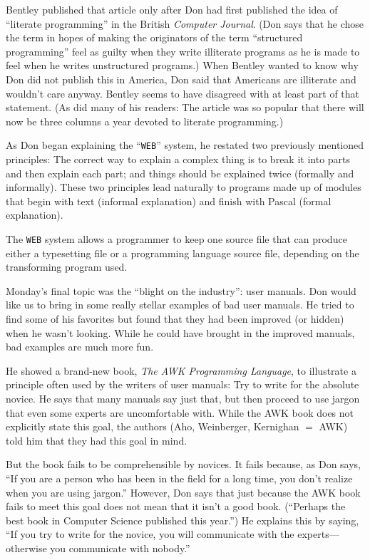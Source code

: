 Bentley published that article only after Don had first published the idea
of ``literate programming'' in the British {\sl Computer Journal}. (Don says that
he chose the term in hopes of making the originators of the term
``structured programming'' feel as guilty when they write illiterate
programs as he is made to feel when he writes unstructured programs.) When
Bentley wanted to know why Don did not publish this in America, Don said
that Americans are illiterate and wouldn't care anyway.  Bentley seems to
have disagreed with at least part of that statement.  (As did many of his
readers: The article was so popular that there will now be three columns a
year devoted to literate programming.)

As Don began explaining the ``{\tt WEB}'' system, he restated two previously
mentioned principles: The correct way to explain a complex thing is to
break it into parts and then explain each part; and things should be
explained twice (formally and informally).  These two principles lead
naturally to programs made up of modules that begin with text (informal
explanation) and finish with Pascal (formal explanation).

The {\tt WEB} system allows a programmer to keep one source file that can
produce either a typesetting
file or a programming language source file, depending
on the transforming program used.

Monday's final topic was the ``blight on the industry'': user manuals.  Don
would like us to bring in some really stellar examples of bad user
manuals.  He tried to find some of his favorites but found that they had
been improved (or hidden) when he wasn't looking.  While he could have
brought in the improved manuals, bad examples are much more fun.

He showed a brand-new book, {\sl The AWK Programming Language}, to illustrate
a principle often used by the writers of user manuals: Try to write for
the absolute novice.  He says that many manuals say just that, but then
proceed to use jargon that even some experts are uncomfortable with.
While the AWK book does not explicitly state this goal, the authors
(Aho, Weinberger, Kernighan $=$ AWK) told him that they had this goal in mind.

But the book fails to be comprehensible by novices. It
fails because, as Don says, ``If you are a person who has been in the
field for a long time, you don't realize when you are using jargon.''
However, Don says that just because the AWK book fails to meet this goal
does not mean that it isn't a good book. (``Perhaps the best book in
Computer Science published this
year.'') He explains this by saying, ``If you try to write for the
novice, you will communicate with the experts---otherwise you communicate
with nobody.''


